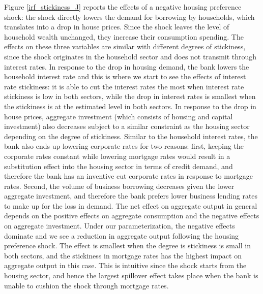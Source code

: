 \documentclass[12pt]{article}
\numberwithin{equation}{section}
\begin{document}
Figure \ref{irf_stickiness_J} reports the effects of a negative housing preference shock: the shock directly lowers the demand for borrowing by households, which translates into a drop in house prices. Since the shock leaves the level of household wealth unchanged, they increase their consumption spending. The effects on these three variables are similar with different degrees of stickiness, since the shock originates in the household sector and does not transmit through interest rates. In response to the drop in housing demand, the bank lowers the household interest rate and this is where we start to see the effects of interest rate stickiness: it is able to cut the interest rates the most when interest rate stickiness is low in both sectors, while the drop in interest rates is smallest when the stickiness is at the estimated level in both sectors. 
In response to the drop in house prices, aggregate investment (which consists of housing and capital investment) also decreases subject to a similar constraint as the housing sector depending on the degree of stickiness. Similar to the household interest rates, the bank also ends up lowering corporate rates for two reasons: first, keeping the corporate rates constant while lowering mortgage rates would result in a substitution effect into the housing sector in terms of credit demand, and therefore the bank has an inventive cut corporate rates in response to mortgage rates. Second, the volume of business borrowing decreases given the lower aggregate investment, and therefore the bank prefers lower business lending rates to make up for the loss in demand.  The net effect on aggregate output in general depends on the positive effects on aggregate consumption and the negative effects on aggregate investment. Under our parameterization, the negative effects dominate and we see a reduction in aggregate output following the housing preference shock. The effect is smallest when the degree is stickiness is small in both sectors, and the stickiness in mortgage rates has the highest impact on aggregate output in this case. This is intuitive since the shock starts from the housing sector, and hence the largest spillover effect takes place when the bank is unable to cushion the shock through mortgage rates. 
\end{document}
